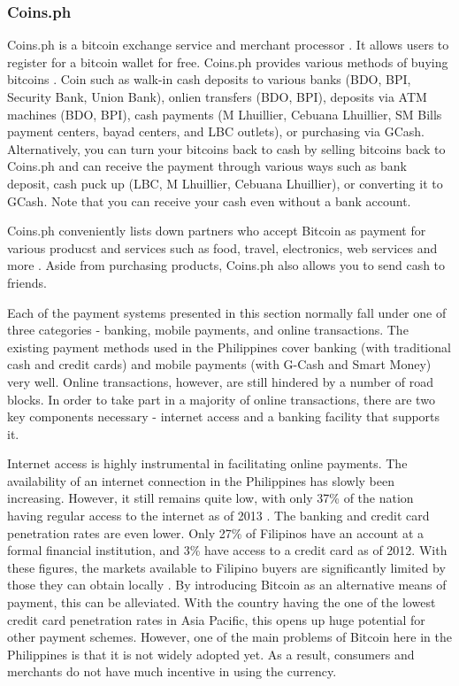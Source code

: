 \documentclass{acm_proc_article-sp}
\begin{document}
\subsubsection{Coins.ph}
Coins.ph is a bitcoin exchange service and merchant processor \cite{Coins.ph:06292014}. It allows users to register for a bitcoin wallet for free. Coins.ph provides various methods of buying bitcoins \cite{Coins.ph:12042014}. Coin such as walk-in cash deposits to various banks (BDO, BPI, Security Bank, Union Bank), onlien transfers (BDO, BPI), deposits via ATM  machines (BDO, BPI), cash payments (M Lhuillier, Cebuana Lhuillier, SM Bills payment centers, bayad centers, and LBC outlets), or purchasing via GCash. Alternatively, you can turn your bitcoins back to cash by selling bitcoins back to Coins.ph and can receive the payment through various ways such as bank deposit, cash puck up (LBC, M Lhuillier, Cebuana Lhuillier), or converting it to GCash. Note that you can receive your cash even without a bank account.

Coins.ph conveniently lists down partners who accept Bitcoin as payment for various producst and services such as food, travel, electronics, web services and more \cite{Coins.ph:12092014}. Aside from purchasing products, Coins.ph also allows you to send cash to friends.

Each of the payment systems presented in this section normally fall under one of three categories - banking, mobile payments, and online transactions. The existing payment methods used in the Philippines cover banking (with traditional cash and credit cards) and mobile payments (with G-Cash and Smart Money) very well. Online transactions, however, are still hindered by a number of road blocks. In order to take part in a majority of online transactions, there are two key components necessary - internet access and a banking facility that supports it.

Internet access is highly instrumental in facilitating online payments. The availability of an internet connection in the Philippines has slowly been increasing. However, it still remains quite low, with only 37\% of the nation having regular access to the internet as of 2013 \cite{Techinasia:01092014}. The banking and credit card penetration rates are even lower. Only 27\% of Filipinos have an account at a formal financial institution, and 3\% have access to a credit card as of 2012. With these figures, the markets available to Filipino buyers are significantly limited by those they can obtain locally \cite{ABSCBN:09232014}. By introducing Bitcoin as an alternative means of payment, this can be alleviated. With the country having the one of the lowest credit card penetration rates in Asia Pacific, this opens up huge potential for other payment schemes. However, one of the main problems of Bitcoin here in the Philippines is that it is not widely adopted yet. As a result, consumers and merchants do not have much incentive in using the currency.
\end{document}
